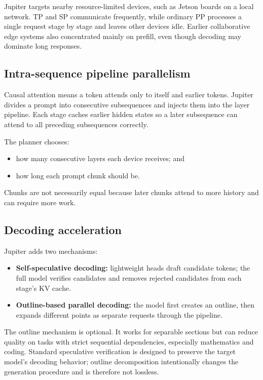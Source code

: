\documentclass[10pt,a4paper]{article}
\begin{document}
Jupiter targets nearby resource-limited devices, such as Jetson boards on a local network. TP and SP communicate frequently, while ordinary PP processes a single request stage by stage and leaves other devices idle. Earlier collaborative edge systems also concentrated mainly on prefill, even though decoding may dominate long responses.

\subsection{Intra-sequence pipeline parallelism}

Causal attention means a token attends only to itself and earlier tokens. Jupiter divides a prompt into consecutive subsequences and injects them into the layer pipeline. Each stage caches earlier hidden states so a later subsequence can attend to all preceding subsequences correctly.

The planner chooses:
\begin{itemize}
  \item how many consecutive layers each device receives; and
  \item how long each prompt chunk should be.
\end{itemize}

Chunks are not necessarily equal because later chunks attend to more history and can require more work.

\subsection{Decoding acceleration}

Jupiter adds two mechanisms:
\begin{itemize}
  \item \textbf{Self-speculative decoding:} lightweight heads draft candidate tokens; the full model verifies candidates and removes rejected candidates from each stage's KV cache.
  \item \textbf{Outline-based parallel decoding:} the model first creates an outline, then expands different points as separate requests through the pipeline.
\end{itemize}

The outline mechanism is optional. It works for separable sections but can reduce quality on tasks with strict sequential dependencies, especially mathematics and coding. Standard speculative verification is designed to preserve the target model's decoding behavior; outline decomposition intentionally changes the generation procedure and is therefore not lossless.
\end{document}
